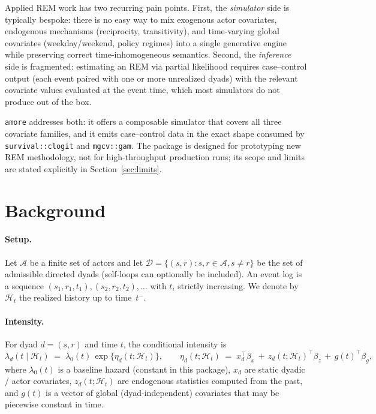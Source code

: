 \documentclass[11pt,a4paper]{article}
\begin{document}
Applied REM work has two recurring pain points.  First, the
\emph{simulator} side is typically bespoke: there is no easy way to
mix exogenous actor covariates, endogenous mechanisms (reciprocity,
transitivity), and time-varying global covariates (weekday/weekend,
policy regimes) into a single generative engine while preserving
correct time-inhomogeneous semantics.  Second, the \emph{inference}
side is fragmented: estimating an REM via partial likelihood
\citep{perry2013point} requires case--control output (each event
paired with one or more unrealized dyads) with the relevant covariate
values evaluated at the event time, which most simulators do not
produce out of the box.

\texttt{amore} addresses both: it offers a composable simulator that
covers all three covariate families, and it emits case--control data
in the exact shape consumed by \texttt{survival::clogit} and
\texttt{mgcv::gam}.  The package is designed for prototyping new REM
methodology, not for high-throughput production runs; its scope and
limits are stated explicitly in Section~\ref{sec:limits}.

\section{Background}

\paragraph{Setup.}
Let $\mathcal{A}$ be a finite set of actors and let
$\mathcal{D} = \{(s, r) : s, r \in \mathcal{A}, s \neq r\}$ be the
set of admissible directed dyads (self-loops can optionally be
included).  An event log is a sequence
$(s_1, r_1, t_1), (s_2, r_2, t_2), \dots$ with $t_i$ strictly
increasing.  We denote by $\mathcal{H}_t$ the realized history up to
time~$t^-$.

\paragraph{Intensity.}
For dyad $d = (s, r)$ and time $t$, the conditional intensity is
\begin{equation}
\lambda_d(t \mid \mathcal{H}_t) \;=\;
\lambda_0(t) \,\exp\!\bigl\{\eta_d(t; \mathcal{H}_t)\bigr\},
\qquad
\eta_d(t; \mathcal{H}_t) \;=\;
x_d^\top \beta_x \,+\, z_d(t; \mathcal{H}_t)^\top \beta_z
\,+\, g(t)^\top \beta_g,
\label{eq:intensity}
\end{equation}
where $\lambda_0(t)$ is a baseline hazard (constant in this package),
$x_d$ are static dyadic / actor covariates, $z_d(t; \mathcal{H}_t)$
are endogenous statistics computed from the past, and $g(t)$ is a
vector of global (dyad-independent) covariates that may be piecewise
constant in time.
\end{document}
